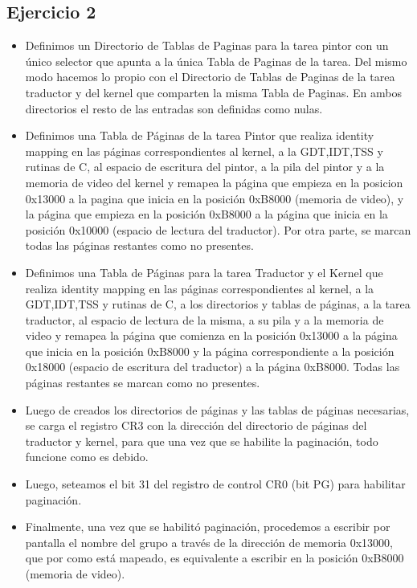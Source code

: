 \subsection{Ejercicio 2}
\begin{itemize}
 \item Definimos un Directorio de Tablas de Paginas para la tarea pintor con un \'unico selector que apunta a la \'unica Tabla de Paginas de la tarea. Del mismo modo hacemos lo propio con el Directorio de Tablas de Paginas de la tarea traductor y del kernel que comparten la misma Tabla de Paginas. En ambos directorios el resto de las entradas son definidas como nulas.
 \item Definimos una Tabla de P\'aginas de la tarea Pintor que realiza identity mapping en las p\'aginas correspondientes al kernel, a la GDT,IDT,TSS y rutinas de C, al espacio de escritura del pintor, a la pila del pintor y a la memoria de video del kernel y remapea la p\'agina que empieza en la posicion 0x13000 a la pagina que inicia en la posici\'on 0xB8000 (memoria de video), y la p\'agina que empieza en la posici\'on 0xB8000 a la p\'agina que inicia en la posici\'on 0x10000 (espacio de lectura del traductor). Por otra parte, se marcan todas las p\'aginas restantes como no presentes.
 \item Definimos una Tabla de P\'aginas para la tarea Traductor y el Kernel que realiza identity mapping en las p\'aginas correspondientes al kernel, a la GDT,IDT,TSS y rutinas de C, a los directorios y tablas de p\'aginas, a la tarea traductor, al espacio de lectura de la misma, a su pila y a la memoria de video y remapea la p\'agina que comienza en la posici\'on 0x13000 a la p\'agina que inicia en la posici\'on 0xB8000 y la p\'agina correspondiente a la posici\'on 0x18000 (espacio de escritura del traductor) a la p\'agina 0xB8000. Todas las p\'aginas restantes se marcan como no presentes.
 \item Luego de creados los directorios de p\'aginas y las tablas de p\'aginas necesarias, se carga el registro CR3 con la direcci\'on del directorio de p\'aginas del traductor y kernel, para que una vez que se habilite la paginaci\'on, todo funcione como es debido.
 \item Luego, seteamos el bit 31 del registro de control CR0 (bit PG) para habilitar paginaci\'on.
 \item Finalmente, una vez que se habilit\'o paginaci\'on, procedemos a escribir por pantalla el nombre del grupo a trav\'es de la direcci\'on de memoria 0x13000, que por como est\'a mapeado, es equivalente a escribir en la posici\'on 0xB8000 (memoria de video).
\end{itemize}

